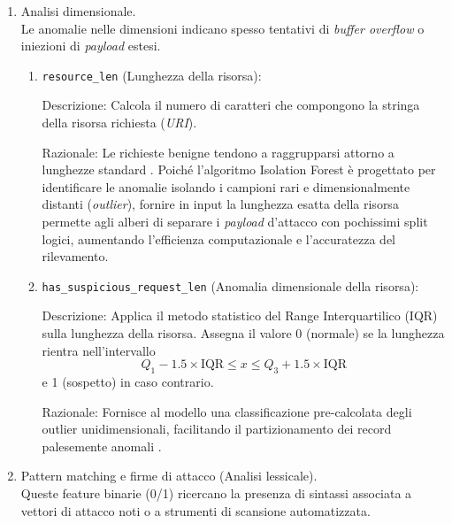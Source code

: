 \begin{enumerate}
      \item Analisi dimensionale. \\
            Le anomalie nelle dimensioni indicano spesso tentativi di \emph{buffer overflow} o iniezioni di \emph{payload} estesi.

            \renewcommand{\labelenumii}{\theenumi.\arabic{enumii}}
            \begin{enumerate}
                  \item \texttt{resource\_len} (Lunghezza della risorsa):

                        Descrizione: Calcola il numero di caratteri che compongono la stringa della risorsa richiesta (\emph{URI}).

                        Razionale: Le richieste benigne tendono a raggrupparsi attorno a lunghezze standard \parencite{kruegel2003anomaly}. Poiché l'algoritmo Isolation Forest è progettato per identificare le anomalie isolando i campioni rari e dimensionalmente distanti (\emph{outlier}), fornire in input la lunghezza esatta della risorsa permette agli alberi di separare i \emph{payload} d'attacco con pochissimi split logici, aumentando l'efficienza computazionale e l'accuratezza del rilevamento.
                  \item \texttt{has\_suspicious\_request\_len} (Anomalia dimensionale della risorsa):

                        Descrizione: Applica il metodo statistico del Range Interquartilico (IQR) sulla lunghezza della risorsa. Assegna il valore 0 (normale) se la lunghezza rientra nell’intervallo
                        \begin{equation}
                              Q_1 - 1.5 \times \text{IQR} \le x \le Q_3 + 1.5 \times \text{IQR}
                        \end{equation}
                        e 1 (sospetto) in caso contrario.

                        Razionale: Fornisce al modello una classificazione pre-calcolata degli outlier unidimensionali, facilitando il partizionamento dei record palesemente anomali \parencite{kruegel2003anomaly}.
            \end{enumerate}

      \item Pattern matching e firme di attacco (Analisi lessicale).\\
            Queste feature binarie (0/1) ricercano la presenza di sintassi associata a vettori di attacco noti o a strumenti di scansione automatizzata.


\end{enumerate}
